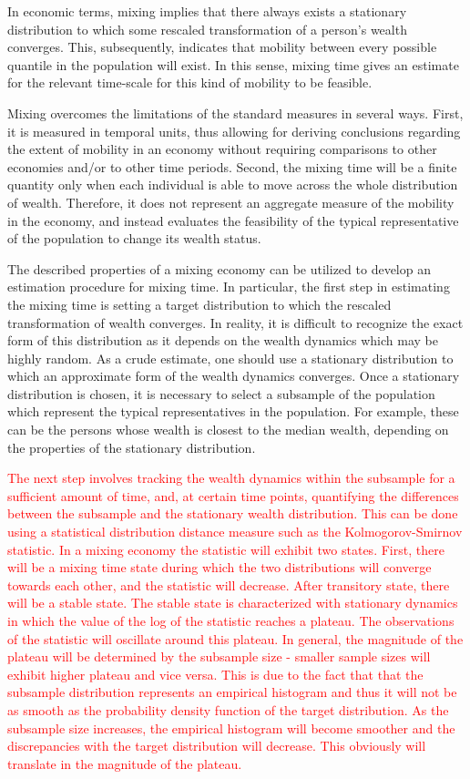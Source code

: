\documentclass[11pt]{article}
\numberwithin{equation}{section}
\begin{document}
In economic terms, mixing implies that there always exists a stationary distribution to which some rescaled transformation of a person's wealth converges. This, subsequently, indicates that mobility between every possible quantile in the population will exist. In this sense, mixing time gives an estimate for the relevant time-scale for this kind of mobility to be feasible.

Mixing overcomes the limitations of the standard measures in several ways. First, it is measured in temporal units, thus allowing for deriving conclusions regarding the extent of mobility in an economy without requiring comparisons to other economies and/or to other time periods. Second, the mixing time will be a finite quantity only when each individual is able to move across the whole distribution of wealth. Therefore, it does not represent an aggregate measure of the mobility in the economy, and instead evaluates the feasibility of the typical representative of the population to change its wealth status.

The described properties of a mixing economy can be utilized to develop an estimation procedure for mixing time. In particular, the first step in estimating the mixing time is setting a target distribution to which the rescaled transformation of wealth converges. In reality, it is difficult to recognize the exact form of this distribution as it depends on the wealth dynamics which may be highly random. As a crude estimate, one should use a stationary distribution to which an approximate form of the wealth dynamics converges. Once a stationary distribution is chosen, it is necessary to select a subsample of the population which represent the typical representatives in the population. For example, these can be the persons whose wealth is closest to the median wealth, depending on the properties of the stationary distribution.

\textcolor{red}{The next step involves tracking the wealth dynamics within the subsample for a sufficient amount of time, and, at certain time points, quantifying the differences between the subsample and the stationary wealth distribution. This can be done using a statistical distribution distance measure such as the Kolmogorov-Smirnov statistic. In a mixing economy the statistic will exhibit two states.  First, there will be a mixing time state during which the two distributions will converge towards each other, and the statistic will decrease. After transitory state, there will be a stable state. The stable state is characterized with stationary dynamics in which the value of the log of the statistic reaches a plateau. The observations of the statistic will oscillate around this plateau. In general, the magnitude of the plateau will be determined by the subsample size - smaller sample sizes will exhibit higher plateau and vice versa. This is due to the fact that that the subsample distribution represents an empirical histogram and thus it will not be as smooth as the probability density function of the target distribution. As the subsample size increases, the empirical histogram will become smoother and the discrepancies with the target distribution will decrease. This obviously will translate in the magnitude of the plateau.}
\end{document}
